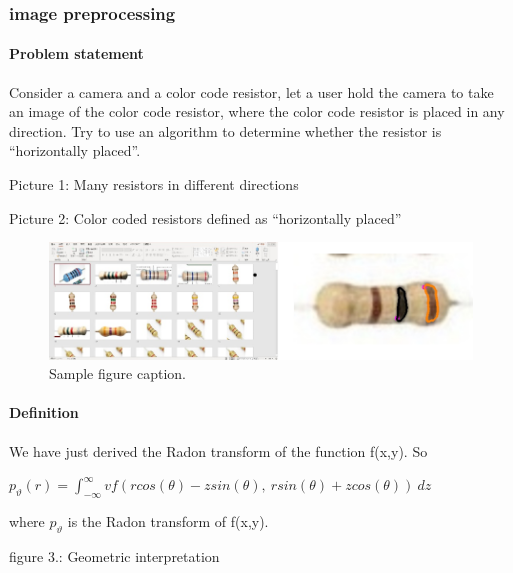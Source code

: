\documentclass{article}
\begin{document}
\subsubsection{image preprocessing}


\paragraph{Problem statement}
Consider a camera and a color code resistor, let a user hold the camera to take an image of the color code resistor, where the color code resistor is placed in any direction.
Try to use an algorithm to determine whether the resistor is “horizontally placed”.

Picture 1: Many resistors in different directions

Picture 2: Color coded resistors defined as “horizontally placed”

\begin{figure}
	\centering
	\includegraphics[width=0.7\linewidth]{Wr4nVKT.png}
	\caption{Sample figure caption.}
	\label{fig:wr4nvkt}
\end{figure}

\paragraph{Definition}

We have just derived the Radon transform of the function f(x,y). So

$p_\vartheta(r)=\int_{-\infty}^{\infty}vf(rcos(\theta)-zsin(\theta),\ rsin(\theta)+zcos(\theta))\ dz$

where $p_\vartheta$ is the Radon transform of f(x,y).\citep{githubGitHubGpeyrenumericaltours}

figure 3.: Geometric interpretation
\end{document}
